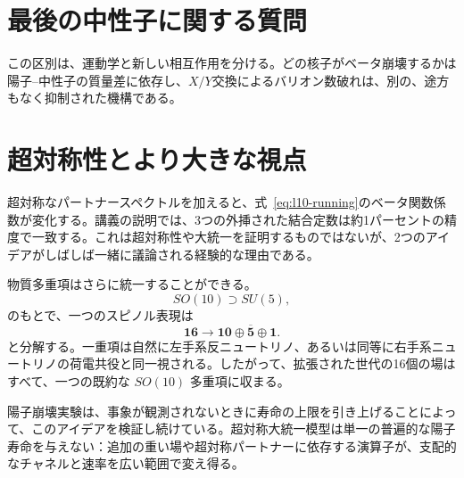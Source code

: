 \section{最後の中性子に関する質問}

\begin{classroomqa}
\end{classroomqa}

この区別は、運動学と新しい相互作用を分ける。どの核子がベータ崩壊するかは陽子--中性子の質量差に依存し、\(X/Y\)交換によるバリオン数破れは、別の、途方もなく抑制された機構である。

\section{超対称性とより大きな視点}

超対称なパートナースペクトルを加えると、式~\eqref{eq:l10-running}のベータ関数係数が変化する。講義の説明では、3つの外挿された結合定数は約1パーセントの精度で一致する。これは超対称性や大統一を証明するものではないが、2つのアイデアがしばしば一緒に議論される経験的な理由である。

物質多重項はさらに統一することができる。\begin{equation}
SO(10)\supset SU(5),
\end{equation} のもとで、一つのスピノル表現は \begin{equation}
\mathbf{16}
\longrightarrow
\mathbf{10}\oplus\overline{\mathbf5}\oplus\mathbf1.
\label{eq:l10-so10}
\end{equation} と分解する。一重項は自然に左手系反ニュートリノ、あるいは同等に右手系ニュートリノの荷電共役と同一視される。したがって、拡張された世代の16個の場はすべて、一つの既約な \(SO(10)\) 多重項に収まる。

陽子崩壊実験は、事象が観測されないときに寿命の上限を引き上げることによって、このアイデアを検証し続けている。超対称大統一模型は単一の普遍的な陽子寿命を与えない：追加の重い場や超対称パートナーに依存する演算子が、支配的なチャネルと速率を広い範囲で変え得る。

